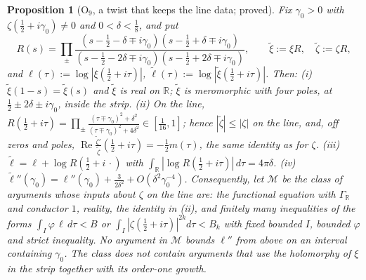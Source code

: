 \documentclass[11pt]{amsart}
\newtheorem{proposition}[theorem]{Proposition}
\theoremstyle{definition}
\theoremstyle{remark}
\newcommand{\R}{\mathbb R}
\newcommand{\Rel}{\operatorname{Re}}
\begin{document}
\begin{proposition}[$\mathrm O_9$, a twist that keeps the line data; proved]\label{prop:shape-twist}
Fix $\gamma_0>0$ with $\zeta(\frac12+i\gamma_0)\ne0$ and $0<\delta<\frac18$, and put
\[
R(s)=\prod_{\pm}\frac{(s-\frac12-\delta\mp i\gamma_0)(s-\frac12+\delta\mp i\gamma_0)}{(s-\frac12-2\delta\mp i\gamma_0)(s-\frac12+2\delta\mp i\gamma_0)},
\qquad\tilde\xi:=\xi R,\quad\tilde\zeta:=\zeta R,
\]
and $\ell(\tau):=\log|\xi(\frac12+i\tau)|$, $\tilde\ell(\tau):=\log|\tilde\xi(\frac12+i\tau)|$. Then:
\emph{(i)} $\tilde\xi(1-s)=\tilde\xi(s)$ and $\tilde\xi$ is real on $\R$; $\tilde\xi$ is meromorphic with four poles, at
$\frac12\pm2\delta\pm i\gamma_0$, inside the strip.
\emph{(ii)} On the line, $R(\frac12+i\tau)=\prod_\pm\frac{(\tau\mp\gamma_0)^2+\delta^2}{(\tau\mp\gamma_0)^2+4\delta^2}\in[\frac1{16},1]$; hence
$|\tilde\zeta|\le|\zeta|$ on the line, and, off zeros and poles, $\Rel\frac{\tilde\zeta'}{\tilde\zeta}(\frac12+i\tau)=-\frac12m(\tau)$,
the same identity as for $\zeta$.
\emph{(iii)} $\tilde\ell=\ell+\log R(\frac12+i\,\cdot)$ with $\int_\R|\log R(\tfrac12+i\tau)|\,d\tau=4\pi\delta$.
\emph{(iv)} $\tilde\ell''(\gamma_0)=\ell''(\gamma_0)+\frac3{2\delta^2}+O(\delta^2\gamma_0^{-4})$.
Consequently, let $\mathcal M$ be the class of arguments whose inputs about $\zeta$ on the line are: the functional equation with
$\Gamma_\R$ and conductor $1$, reality, the identity in (ii), and finitely many inequalities of the forms
$\int_I\varphi\,\ell\,d\tau<B$ or $\int_I|\zeta(\frac12+i\tau)|^{2k}d\tau<B_k$ with fixed bounded $I$, bounded $\varphi$ and strict
inequality. No argument in $\mathcal M$ bounds $\ell''$ from above on an interval containing $\gamma_0$. The class does not contain
arguments that use the holomorphy of $\xi$ in the strip together with its order-one growth.
\end{proposition}
\end{document}
